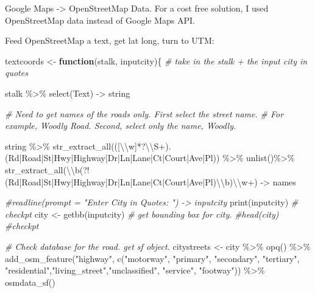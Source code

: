 \documentclass[
]{article}
\newenvironment{Shaded}{\begin{snugshade}}{\end{snugshade}}
\newcommand{\CommentTok}[1]{\textcolor[rgb]{0.56,0.35,0.01}{\textit{#1}}}
\newcommand{\ControlFlowTok}[1]{\textcolor[rgb]{0.13,0.29,0.53}{\textbf{#1}}}
\newcommand{\FunctionTok}[1]{\textcolor[rgb]{0.00,0.00,0.00}{#1}}
\newcommand{\NormalTok}[1]{#1}
\newcommand{\OtherTok}[1]{\textcolor[rgb]{0.56,0.35,0.01}{#1}}
\newcommand{\SpecialCharTok}[1]{\textcolor[rgb]{0.00,0.00,0.00}{#1}}
\newcommand{\StringTok}[1]{\textcolor[rgb]{0.31,0.60,0.02}{#1}}
\begin{document}
Google Maps -\textgreater{} OpenStreetMap Data. For a cost free
solution, I used OpenStreetMap data instead of Google Maps API.

Feed OpenStreetMap a text, get lat long, turn to UTM:

\begin{Shaded}
\begin{Highlighting}[]
\NormalTok{textcoords }\OtherTok{\textless{}{-}} \ControlFlowTok{function}\NormalTok{(stalk, inputcity)\{ }\CommentTok{\# take in the stalk + the input city in quotes}
  
\NormalTok{  stalk }\SpecialCharTok{\%\textgreater{}\%}
    \FunctionTok{select}\NormalTok{(Text) }\OtherTok{{-}\textgreater{}}\NormalTok{ string}
  
\CommentTok{\# Need to get names of the roads only. First select the street name. }
\CommentTok{\# For example, Woodly Road. Second, select only the name, Woodly. }
  
\NormalTok{  string }\SpecialCharTok{\%\textgreater{}\%}
    \FunctionTok{str\_extract\_all}\NormalTok{(}\StringTok{\textquotesingle{}([}\SpecialCharTok{\textbackslash{}\textbackslash{}}\StringTok{w]*?}\SpecialCharTok{\textbackslash{}\textbackslash{}}\StringTok{S+).(Rd|Road|St|Hwy|Highway|Dr|Ln|Lane|Ct|Court|Ave|Pl)\textquotesingle{}}\NormalTok{) }\SpecialCharTok{\%\textgreater{}\%} 
    \FunctionTok{unlist}\NormalTok{()}\SpecialCharTok{\%\textgreater{}\%}
    \FunctionTok{str\_extract\_all}\NormalTok{(}\StringTok{\textquotesingle{}}\SpecialCharTok{\textbackslash{}\textbackslash{}}\StringTok{b(?!(Rd|Road|St|Hwy|Highway|Dr|Ln|Lane|Ct|Court|Ave|Pl)}\SpecialCharTok{\textbackslash{}\textbackslash{}}\StringTok{b)}\SpecialCharTok{\textbackslash{}\textbackslash{}}\StringTok{w+\textquotesingle{}}\NormalTok{) }\OtherTok{{-}\textgreater{}}\NormalTok{ names}
  
  \CommentTok{\#readline(prompt = "Enter City in Quotes: ") {-}\textgreater{} inputcity}
  \FunctionTok{print}\NormalTok{(inputcity) }\CommentTok{\# checkpt}
\NormalTok{  city }\OtherTok{\textless{}{-}} \FunctionTok{getbb}\NormalTok{(inputcity) }\CommentTok{\# get bounding box for city.}
  \CommentTok{\#head(city) \#checkpt}
  
\CommentTok{\# Check database for the road. get sf object.}
\NormalTok{  citystreets }\OtherTok{\textless{}{-}}\NormalTok{ city }\SpecialCharTok{\%\textgreater{}\%}
    \FunctionTok{opq}\NormalTok{() }\SpecialCharTok{\%\textgreater{}\%}
    \FunctionTok{add\_osm\_feature}\NormalTok{(}\StringTok{"highway"}\NormalTok{, }\FunctionTok{c}\NormalTok{(}\StringTok{"motorway"}\NormalTok{, }\StringTok{"primary"}\NormalTok{, }\StringTok{"secondary"}\NormalTok{, }\StringTok{"tertiary"}\NormalTok{, }\StringTok{"residential"}\NormalTok{,}\StringTok{"living\_street"}\NormalTok{,}\StringTok{"unclassified"}\NormalTok{, }\StringTok{"service"}\NormalTok{, }\StringTok{"footway"}\NormalTok{)) }\SpecialCharTok{\%\textgreater{}\%}
    \FunctionTok{osmdata\_sf}\NormalTok{()}
  

\end{Highlighting}
\end{Shaded}
\end{document}
